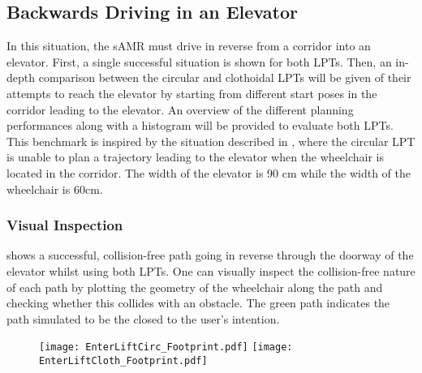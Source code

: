 \newpage

\subsection{Backwards Driving in an Elevator} \label{sec:EvalBackElev}
In this situation, the sAMR must drive in reverse from a corridor into an elevator. First, a single successful situation is shown for both LPTs. Then, an in-depth comparison between the circular and clothoidal LPTs will be given of their attempts to reach the elevator by starting from different start poses in the corridor leading to the elevator. An overview of the different planning performances along with a histogram will be provided to evaluate both LPTs. This benchmark is inspired by the situation described in \cite{VanderPoortenEtAl2012}, where the circular LPT is unable to plan a trajectory leading to the elevator when the wheelchair is located in the corridor. The width of the elevator is 90 cm while the width of the wheelchair is 60cm.

\subsubsection{Visual Inspection}
 shows a successful, collision-free path going in reverse through the doorway of the elevator whilst using both LPTs. One can visually inspect the collision-free nature of each path by plotting the geometry of the wheelchair along the path and checking whether this collides with an obstacle. The green path indicates the path simulated to be the closed to the user’s intention.

\begin{figure}[!htbp]
	\centering
    \texttt{[image: EnterLiftCirc\_Footprint.pdf]}
    \hfill
	 \texttt{[image: EnterLiftCloth\_Footprint.pdf]}
\end{figure}

\newpage

